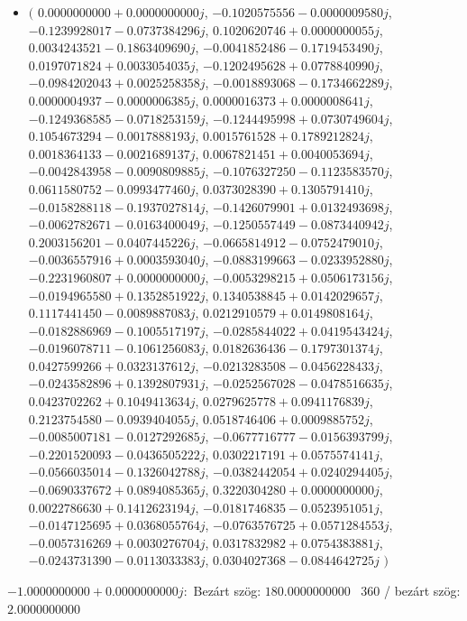 \documentclass[14pt,a4paper]{article}
\begin{document}
\begin{itemize}
\item
$\big($
$0.0000000000+0.0000000000j$, $-0.1020575556-0.0000009580j$, $-0.1239928017-0.0737384296j$, $0.1020620746+0.0000000055j$, $0.0034243521-0.1863409690j$, $-0.0041852486-0.1719453490j$, $0.0197071824+0.0033054035j$, $-0.1202495628+0.0778840990j$, $-0.0984202043+0.0025258358j$, $-0.0018893068-0.1734662289j$, $0.0000004937-0.0000006385j$, $0.0000016373+0.0000008641j$, $-0.1249368585-0.0718253159j$, $-0.1244495998+0.0730749604j$, $0.1054673294-0.0017888193j$, $0.0015761528+0.1789212824j$, $0.0018364133-0.0021689137j$, $0.0067821451+0.0040053694j$, $-0.0042843958-0.0090809885j$, $-0.1076327250-0.1123583570j$, $0.0611580752-0.0993477460j$, $0.0373028390+0.1305791410j$, $-0.0158288118-0.1937027814j$, $-0.1426079901+0.0132493698j$, $-0.0062782671-0.0163400049j$, $-0.1250557449-0.0873440942j$, $0.2003156201-0.0407445226j$, $-0.0665814912-0.0752479010j$, $-0.0036557916+0.0003593040j$, $-0.0883199663-0.0233952880j$, $-0.2231960807+0.0000000000j$, $-0.0053298215+0.0506173156j$, $-0.0194965580+0.1352851922j$, $0.1340538845+0.0142029657j$, $0.1117441450-0.0089887083j$, $0.0212910579+0.0149808164j$, $-0.0182886969-0.1005517197j$, $-0.0285844022+0.0419543424j$, $-0.0196078711-0.1061256083j$, $0.0182636436-0.1797301374j$, $0.0427599266+0.0323137612j$, $-0.0213283508-0.0456228433j$, $-0.0243582896+0.1392807931j$, $-0.0252567028-0.0478516635j$, $0.0423702262+0.1049413634j$, $0.0279625778+0.0941176839j$, $0.2123754580-0.0939404055j$, $0.0518746406+0.0009885752j$, $-0.0085007181-0.0127292685j$, $-0.0677716777-0.0156393799j$, $-0.2201520093-0.0436505222j$, $0.0302217191+0.0575574141j$, $-0.0566035014-0.1326042788j$, $-0.0382442054+0.0240294405j$, $-0.0690337672+0.0894085365j$, $0.3220304280+0.0000000000j$, $0.0022786630+0.1412623194j$, $-0.0181746835-0.0523951051j$, $-0.0147125695+0.0368055764j$, $-0.0763576725+0.0571284553j$, $-0.0057316269+0.0030276704j$, $0.0317832982+0.0754383881j$, $-0.0243731390-0.0113033383j$, $0.0304027368-0.0844642725j$
$\big)$
\end{itemize}
$-1.0000000000+0.0000000000j$:\
Bezárt szög: $180.0000000000$ \
360 / bezárt szög: $2.0000000000$\
\end{document}
